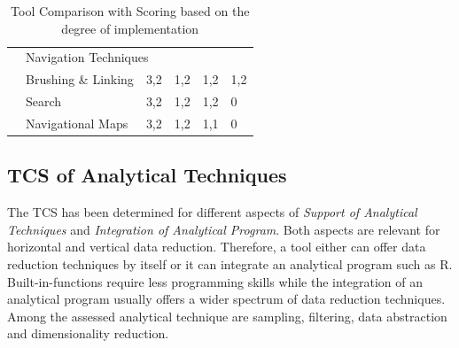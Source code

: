 \begin{table}[H]
\begin{tabular}{|l| l l l l l|}
        & \multicolumn{5}{l|}{\cellcolor{gray!30}Navigation Techniques}\\\cline{2-6}
        & Brushing \& Linking   & 3,2 & 1,2 & 1,2 & 1,2\\
        & Search                & 3,2 & 1,2 & 1,2 & 0 \\
        & Navigational Maps     & 3,2 & 1,2 & 1,1 & 0 \\
        \hline
    \end{tabular}
    \caption{Tool Comparison with Scoring based on the degree of implementation}
    \end{table}
   
\subsection*{TCS of Analytical Techniques}
The TCS has been determined for different aspects of \textit{Support of Analytical Techniques} and \textit{Integration of Analytical Program}. Both aspects are relevant for horizontal and vertical data reduction. Therefore, a tool either can offer data reduction techniques by itself or it can integrate an analytical program such as R. Built-in-functions require less programming skills while the integration of an analytical program usually offers a wider spectrum of data reduction techniques.
Among the assessed analytical technique are sampling, filtering, data abstraction and  dimensionality reduction.

